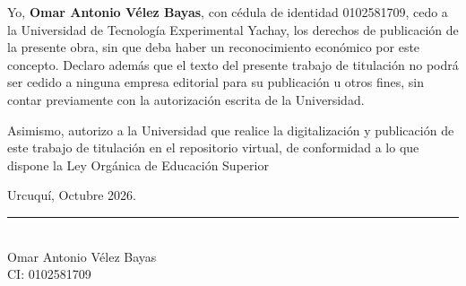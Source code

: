 Yo, \textbf{Omar Antonio Vélez Bayas}, con cédula de identidad 0102581709, cedo a la Universidad de Tecnología Experimental Yachay, los derechos de publicación de la presente obra, sin que deba haber un reconocimiento económico por este concepto. Declaro además que el texto del presente trabajo de titulación no podrá ser cedido a ninguna empresa editorial para su publicación u otros fines, sin contar previamente con la autorización escrita de la Universidad.

\vspace{0.6cm}

\noindent Asimismo, autorizo a la Universidad que realice la digitalización y publicación de este trabajo de titulación en el repositorio virtual, de conformidad a lo que dispone la Ley Orgánica de Educación Superior 

\vspace{0.6cm}

\noindent Urcuquí, Octubre 2026.

\vspace{2.5cm}

\begin{center}
    \rule[0mm]{70mm}{0.1mm} \\
    {Omar Antonio Vélez Bayas}\\
    CI: 0102581709
\end{center}

\thispagestyle{empty} %